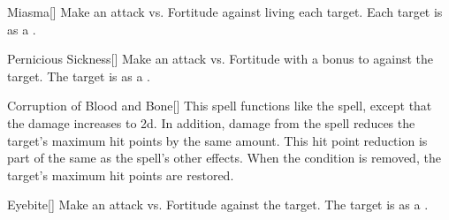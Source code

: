 \lowercase{\hypertarget{spell:Miasma}{}}\label{spell:Miasma}
\begin{freeability}[Rank 3]{\hypertarget{spell:Miasma}{Miasma}}[]
Make an attack vs. Fortitude against living each target.
\hit Each target is  as a .
\end{freeability}
\vspace{0.25em}



\lowercase{\hypertarget{spell:Pernicious Sickness}{}}\label{spell:Pernicious Sickness}
\begin{freeability}[Rank 3]{\hypertarget{spell:Pernicious Sickness}{Pernicious Sickness}}[]
Make an attack vs. Fortitude with a  bonus to  against the target.
\hit The target is  as a .
\end{freeability}
\vspace{0.25em}



\lowercase{\hypertarget{spell:Corruption of Blood and Bone}{}}\label{spell:Corruption of Blood and Bone}
\begin{freeability}[Rank 4]{\hypertarget{spell:Corruption of Blood and Bone}{Corruption of Blood and Bone}}[]
This spell functions like the  spell, except that the damage increases to  \minus2d.
In addition, damage from the spell reduces the target's maximum hit points by the same amount.
This hit point reduction is part of the same  as the spell's other effects.
When the condition is removed, the target's maximum hit points are restored.
\end{freeability}
\vspace{0.25em}



\lowercase{\hypertarget{spell:Eyebite}{}}\label{spell:Eyebite}
\begin{freeability}[Rank 4]{\hypertarget{spell:Eyebite}{Eyebite}}[]
Make an attack vs. Fortitude against the target.
\hit The target is  as a .
\end{freeability}
\vspace{0.25em}



